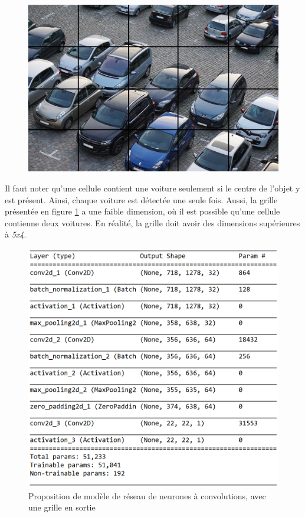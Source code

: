 \begin{figure}[ht]
    \includegraphics[width=120mm]{img/conception/parking_grid.jpg}
    \centering
    \label{fig:parking_grid} 
\end{figure}

Il faut noter qu'une cellule contient une voiture seulement si le centre de l'objet y est présent. Ainsi, chaque voiture est détectée une seule fois. Aussi, la grille présentée en figure \ref{fig:parking_grid} a une faible dimension, où il est possible qu'une cellule contienne deux voitures. En réalité, la grille doit avoir des dimensions supérieures à \textit{5x4}.

\begin{figure}[H]
    \includegraphics[width=12cm]{img/conception/nn/keras_grid.png}
    \centering
    \caption{Proposition de modèle de réseau de neurones à convolutions, avec une grille en sortie}
    \label{fig:keras_grid}
\end{figure} 

